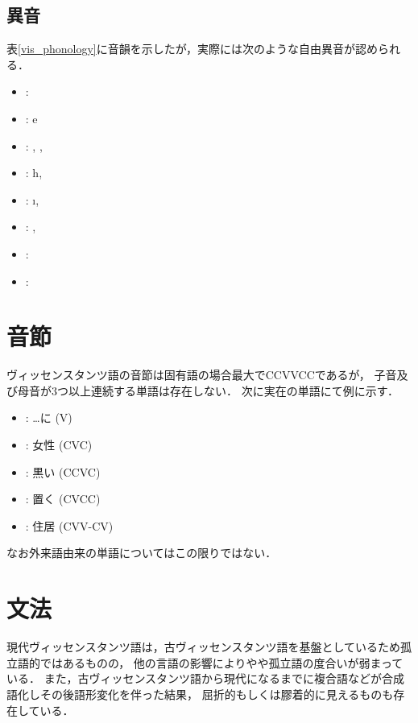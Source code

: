 \documentclass[a4paper,xelatex,ja=standard]{bxjsarticle}
\begin{document}
\subsection{異音}
表\ref{vis_phonology}に音韻を示したが，実際には次のような自由異音が認められる．
\begin{itemize}
 \item \liparxea: {\charis \textscripta}
 \item \liparxee: {\charis e}
 \item \liparxeg: {\charis \textgamma, \textinvscr, \textscr}
 \item \liparxeh: {\charis h,\textchi}
 \item \liparxei: {\charis \i, \textbari}
 \item \liparxer: {\charis \textfishhookr, \textturnr}
 \item \liparxeu: {\charis \textbaru}
 \item \liparxex: {\charis \textctc}
\end{itemize}

\section{音節}
ヴィッセンスタンツ語の音節は固有語の場合最大でCCVVCCであるが，
子音及び母音が3つ以上連続する単語は存在しない．
次に実在の単語にて例に示す．
\begin{itemize}
 \item {}: …に (V)
 \item {}: 女性 (CVC)
 \item {}: 黒い (CCVC)
 \item {}: 置く (CVCC)
 \item {}: 住居 (CVV-CV)
\end{itemize}
なお外来語由来の単語についてはこの限りではない．

\section{文法}
現代ヴィッセンスタンツ語は，古ヴィッセンスタンツ語を基盤としているため孤立語的ではあるものの，
他の言語の影響によりやや孤立語の度合いが弱まっている．
また，古ヴィッセンスタンツ語から現代になるまでに複合語などが合成語化しその後語形変化を伴った結果，
屈折的もしくは膠着的に見えるものも存在している．

\end{document}
